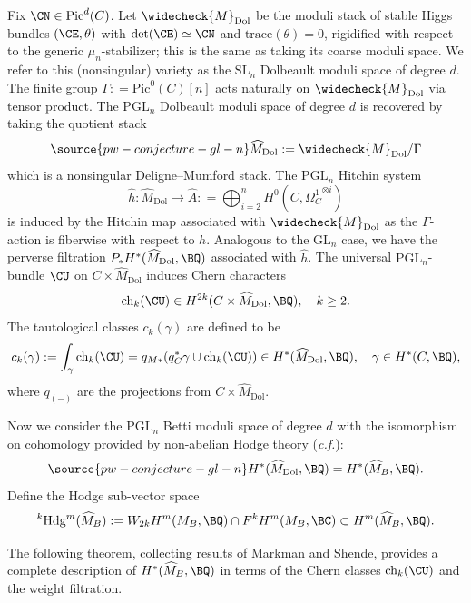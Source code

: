 Fix $\CN \in \mathrm{Pic}^d(C)$. Let $\widecheck{M}_{\mathrm{Dol}}$ be
the moduli stack of stable Higgs bundles $(\CE, \theta)$ with $\mathrm{det}(\CE) \simeq \CN$ and $\mathrm{trace}(\theta) = 0$, rigidified with respect to the generic $\mu_n$-stabilizer; this is the same as taking its coarse moduli space.  We refer to this (nonsingular) variety as the $\mathrm{SL}_n$ Dolbeault moduli space of degree $d$. The finite group $\Gamma: = \mathrm{Pic}^0(C)[n]$ acts naturally on $\widecheck{M}_{\mathrm{Dol}}$ via tensor product. The $\mathrm{PGL}_n$ Dolbeault moduli space of degree $d$ is recovered by taking the quotient stack
\begin{equation}\label{233}
\source{pw-conjecture-gl-n}
\widehat{M}_{\mathrm{Dol}} : = \widecheck{M}_{\mathrm{Dol}}/\Gamma
\end{equation}
which is a nonsingular Deligne--Mumford stack. The $\mathrm{PGL}_n$ Hitchin system
\[
\widehat{h}: \widehat{M}_{\mathrm{Dol}} \to \widehat{A}: = \bigoplus_{i=2}^n H^0(C, {\Omega_C^1}^{\otimes i})
\]
is induced by the Hitchin map associated with $\widecheck{M}_{\mathrm{Dol}}$ as the $\Gamma$-action is fiberwise with respect to $h$. Analogous to the $\mathrm{GL}_n$  case, we have the perverse filtration $P_*H^*(\widehat{M}_{\mathrm{Dol}}, \BQ)$ associated with $\widehat{h}$. The universal $\mathrm{PGL}_n$-bundle $\CU$ on $C \times \widehat{M}_{\mathrm{Dol}}$ induces Chern characters
\[
\mathrm{ch}_k(\CU) \in H^{2k}(C \times \widehat{M}_{\mathrm{Dol}}, \BQ),\quad k \geq 2.
\]
The tautological classes $c_k(\gamma)$ are defined to be
\[
c_k(\gamma): = \int_\gamma \mathrm{ch}_k(\CU) = q_{M*}(q_C^*\gamma \cup \mathrm{ch}_k(\CU)) \in H^*(\widehat{M}_{\mathrm{Dol}}, \BQ), \quad \gamma \in H^*(C,\BQ),
\]
where $q_{(-)}$ are the projections from $C \times \widehat{M}_{\mathrm{Dol}}$.

Now we consider the $\mathrm{PGL}_n$ Betti moduli space of degree $d$ with the isomorphism on cohomology provided by non-abelian Hodge theory (\emph{c.f.}\cite[Theorem 1.2.4]{dCHM1}):
\begin{equation}\label{NAH2}
\source{pw-conjecture-gl-n}
H^*(\widehat{M}_{\mathrm{Dol}}, \BQ) = H^*(\widehat{M}_{B}, \BQ).
\end{equation}
Define the Hodge sub-vector space
\[
^k\mathrm{Hdg}^m(\widehat{M}_B): = W_{2k}H^m(M_B, \BQ) \cap F^kH^m(M_B, \BC) \subset H^m(\widehat{M}_{B}, \BQ).
\]

The following theorem, collecting results of Markman and Shende, provides a complete description of $H^*(\widehat{M}_B, \BQ)$ in terms of the Chern classes $\mathrm{ch}_k(\CU)$ and the weight filtration.

